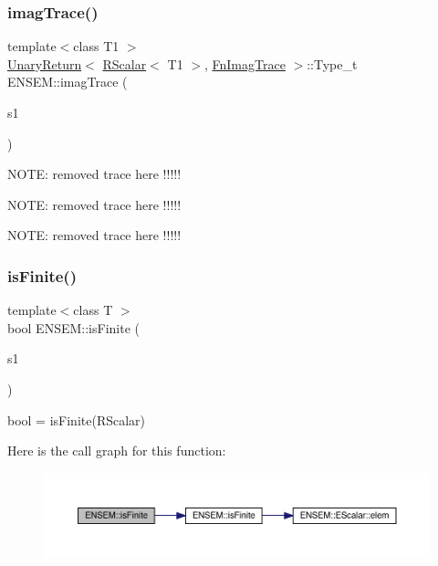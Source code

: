 \mbox{\label{group__rscalar_ga93f83573ea0cfc6dca10a8bf879ab0a7}} 
\subsubsection{\texorpdfstring{imagTrace()}{imagTrace()}}
{\footnotesize\ttfamily template$<$class T1 $>$ \\
\mbox{\hyperlink{structENSEM_1_1UnaryReturn}{Unary\+Return}}$<$ \mbox{\hyperlink{classENSEM_1_1RScalar}{R\+Scalar}}$<$ T1 $>$, \mbox{\hyperlink{structENSEM_1_1FnImagTrace}{Fn\+Imag\+Trace}} $>$\+::Type\+\_\+t E\+N\+S\+E\+M\+::imag\+Trace (\begin{DoxyParamCaption}\item[{const \mbox{\hyperlink{classENSEM_1_1RScalar}{R\+Scalar}}$<$ T1 $>$ \&}]{s1 }\end{DoxyParamCaption})\hspace{0.3cm}{\ttfamily [inline]}}

N\+O\+TE\+: removed trace here !!!!!

N\+O\+TE\+: removed trace here !!!!!

N\+O\+TE\+: removed trace here !!!!! \mbox{\label{group__rscalar_ga7ec54fb1eaedacb87a42df35a5f11001}} 
\subsubsection{\texorpdfstring{isFinite()}{isFinite()}}
{\footnotesize\ttfamily template$<$class T $>$ \\
bool E\+N\+S\+E\+M\+::is\+Finite (\begin{DoxyParamCaption}\item[{const \mbox{\hyperlink{classENSEM_1_1RScalar}{R\+Scalar}}$<$ T $>$ \&}]{s1 }\end{DoxyParamCaption})}



bool = is\+Finite(\+R\+Scalar) 

Here is the call graph for this function\+:\nopagebreak
\begin{figure}[H]
\begin{center}
\leavevmode
\includegraphics[width=350pt]{d9/ded/group__rscalar_ga7ec54fb1eaedacb87a42df35a5f11001_cgraph}
\end{center}
\end{figure}
\mbox{\label{group__rscalar_ga01c23e87027a8c43440f812a0693b62f}} 
